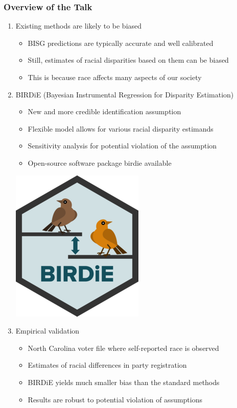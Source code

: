 \documentclass{beamer}
\begin{document}
\begin{frame}

  \frametitle{Overview of the Talk}

  \begin{enumerate}
  \item Existing methods are likely to be biased
    \begin{itemize}
    \item BISG predictions are typically accurate and well calibrated
    \item Still, estimates of racial disparities based on them can be biased
    \item This is because race affects many aspects of our society
    \end{itemize}
    \bigskip
  \item \alert{BIRDiE} (Bayesian Instrumental Regression for Disparity
    Estimation) 
    \begin{itemize}
    \item New and more credible identification assumption
    \item Flexible model allows for various racial disparity estimands
    \item Sensitivity analysis for potential violation of the
      assumption
    \item Open-source software package \alert{birdie} available
    \end{itemize}
    \begin{flushright}
      \vspace{-.5in}
      \includegraphics[scale=0.165]{../man/figures/logo.png}
     \end{flushright}
  \item Empirical validation
    \begin{itemize}
    \item North Carolina voter file where self-reported race is
      observed
    \item Estimates of racial differences in party registration
    \item BIRDiE yields much smaller bias than the standard methods
    \item Results are robust to potential violation of assumptions
    \end{itemize}
  \end{enumerate}

\end{frame}
\end{document}

